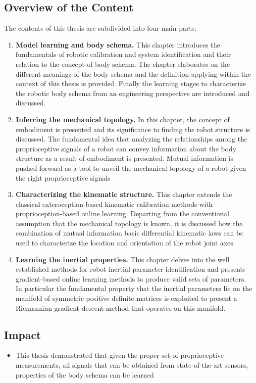 \documentclass[12pt, a4paper]{article}
\begin{document}
\begin{enumerate}
\subsection*{Overview of the Content}
The contents of this thesis are subdivided into four main parts:
\begin{enumerate}
	\item \textbf{Model learning and body schema.} This chapter introduces the fundamentals of robotic calibration and system identification and their relation to the concept of body schema. The chapter elaborates on the different meanings of the body schema and the definition applying within the context of this thesis is provided. Finally the learning stages to characterize the robotic body schema from an engineering perspective are introduced and discussed.
	
	\item \textbf{Inferring the mechanical topology.} In this chapter, the concept of embodiment is presented and its significance to finding the robot structure is discussed. The fundamental idea that analyzing the relationships among the proprioceptive signals of a robot can convey information about the body structure as a result of embodiment is presented. Mutual information is pushed forward as a tool to unveil the mechanical topology of a robot given the right proprioceptive signals
	
	\item \textbf{Characterizing the kinematic structure.} This chapter extends the classical exteroception-based kinematic calibration methods with proprioception-based online learning. Departing from the conventional assumption that the mechanical topology is known, it is discussed how the combination of mutual information basic differential kinematic laws can be used to characterize the location and orientation of the robot joint axes.
	
	\item \textbf{Learning the inertial properties.} This chapter delves into the well established methods for robot inertial parameter identification and presents gradient-based online learning methods to produce valid sets of parameters. In particular the fundamental property that the inertial parameters lie on the manifold of symmetric positive definite matrices is exploited to present a Riemannian gradient descent method that operates on this manifold. 
\end{enumerate}

\subsection*{Impact}
\begin{itemize}
	\item This thesis demonstrated that given the proper set of proprioceptive measurements, all signals that can be obtained from state-of-the-art sensors, properties of the body schema can be learned
	

\end{itemize}
\end{enumerate}
\end{document}
